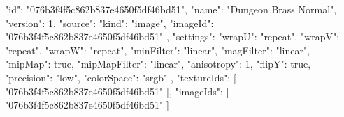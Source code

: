 {
  "id": "076b3f4f5c862b837e4650f5df46bd51",
  "name": "Dungeon Brass Normal",
  "version": 1,
  "source": {
    "kind": "image",
    "imageId": "076b3f4f5c862b837e4650f5df46bd51"
  },
  "settings": {
    "wrapU": "repeat",
    "wrapV": "repeat",
    "wrapW": "repeat",
    "minFilter": "linear",
    "magFilter": "linear",
    "mipMap": true,
    "mipMapFilter": "linear",
    "anisotropy": 1,
    "flipY": true,
    "precision": "low",
    "colorSpace": "srgb"
  },
  "textureIds": [
    "076b3f4f5c862b837e4650f5df46bd51"
  ],
  "imageIds": [
    "076b3f4f5c862b837e4650f5df46bd51"
  ]
}
